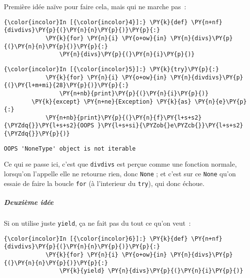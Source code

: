     Première idée naïve pour faire cela, mais qui ne marche pas~:

    \begin{Verbatim}[commandchars=\\\{\},frame=single,framerule=0.3mm,rulecolor=\color{cellframecolor}]
{\color{incolor}In [{\color{incolor}4}]:} \PY{k}{def} \PY{n+nf}{divdivs}\PY{p}{(}\PY{n}{n}\PY{p}{)}\PY{p}{:}
            \PY{k}{for} \PY{n}{i} \PY{o+ow}{in} \PY{n}{divs}\PY{p}{(}\PY{n}{n}\PY{p}{)}\PY{p}{:}
                \PY{n}{divs}\PY{p}{(}\PY{n}{i}\PY{p}{)}
\end{Verbatim}


    \begin{Verbatim}[commandchars=\\\{\},frame=single,framerule=0.3mm,rulecolor=\color{cellframecolor}]
{\color{incolor}In [{\color{incolor}5}]:} \PY{k}{try}\PY{p}{:}
            \PY{k}{for} \PY{n}{i} \PY{o+ow}{in} \PY{n}{divdivs}\PY{p}{(}\PY{l+m+mi}{28}\PY{p}{)}\PY{p}{:}
                \PY{n+nb}{print}\PY{p}{(}\PY{n}{i}\PY{p}{)}
        \PY{k}{except} \PY{n+ne}{Exception} \PY{k}{as} \PY{n}{e}\PY{p}{:}
            \PY{n+nb}{print}\PY{p}{(}\PY{n}{f}\PY{l+s+s2}{\PYZdq{}}\PY{l+s+s2}{OOPS }\PY{l+s+si}{\PYZob{}e\PYZcb{}}\PY{l+s+s2}{\PYZdq{}}\PY{p}{)}
\end{Verbatim}


    \begin{Verbatim}[commandchars=\\\{\},frame=single,framerule=0.3mm,rulecolor=\color{cellframecolor}]
OOPS 'NoneType' object is not iterable
\end{Verbatim}

    Ce qui se passe ici, c'est que \texttt{divdivs} est perçue comme une
fonction normale, lorsqu'on l'appelle elle ne retourne rien, donc
\texttt{None} ; et c'est sur ce \texttt{None} qu'on essaie de faire la
boucle \texttt{for} (à l'interieur du \texttt{try}), qui donc échoue.

    \hypertarget{deuxiuxe8me-iduxe9e}{%
\subparagraph{Deuxième idée}\label{deuxiuxe8me-iduxe9e}}

    Si on utilise juste \texttt{yield}, ça ne fait pas du tout ce qu'on
veut~:

    \begin{Verbatim}[commandchars=\\\{\},frame=single,framerule=0.3mm,rulecolor=\color{cellframecolor}]
{\color{incolor}In [{\color{incolor}6}]:} \PY{k}{def} \PY{n+nf}{divdivs}\PY{p}{(}\PY{n}{n}\PY{p}{)}\PY{p}{:}
            \PY{k}{for} \PY{n}{i} \PY{o+ow}{in} \PY{n}{divs}\PY{p}{(}\PY{n}{n}\PY{p}{)}\PY{p}{:}
                \PY{k}{yield} \PY{n}{divs}\PY{p}{(}\PY{n}{i}\PY{p}{)}
\end{Verbatim}


